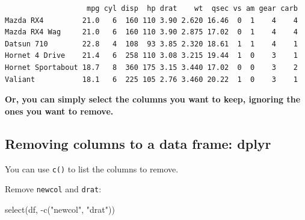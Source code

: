 \documentclass[
]{article}
\newenvironment{Shaded}{\begin{snugshade}}{\end{snugshade}}
\newcommand{\FunctionTok}[1]{\textcolor[rgb]{0.00,0.00,0.00}{#1}}
\newcommand{\NormalTok}[1]{#1}
\newcommand{\SpecialCharTok}[1]{\textcolor[rgb]{0.00,0.00,0.00}{#1}}
\newcommand{\StringTok}[1]{\textcolor[rgb]{0.31,0.60,0.02}{#1}}
\begin{document}
\begin{verbatim}
                   mpg cyl disp  hp drat    wt  qsec vs am gear carb
Mazda RX4         21.0   6  160 110 3.90 2.620 16.46  0  1    4    4
Mazda RX4 Wag     21.0   6  160 110 3.90 2.875 17.02  0  1    4    4
Datsun 710        22.8   4  108  93 3.85 2.320 18.61  1  1    4    1
Hornet 4 Drive    21.4   6  258 110 3.08 3.215 19.44  1  0    3    1
Hornet Sportabout 18.7   8  360 175 3.15 3.440 17.02  0  0    3    2
Valiant           18.1   6  225 105 2.76 3.460 20.22  1  0    3    1
\end{verbatim}

\textbf{Or, you can simply select the columns you want to keep, ignoring
the ones you want to remove.}

\hypertarget{removing-columns-to-a-data-frame-dplyr}{%
\subsection{Removing columns to a data frame:
dplyr}\label{removing-columns-to-a-data-frame-dplyr}}

You can use \texttt{c()} to list the columns to remove.

Remove \texttt{newcol} and \texttt{drat}:

\begin{Shaded}
\begin{Highlighting}[]
\FunctionTok{select}\NormalTok{(df, }\SpecialCharTok{{-}}\FunctionTok{c}\NormalTok{(}\StringTok{"newcol"}\NormalTok{, }\StringTok{"drat"}\NormalTok{))}
\end{Highlighting}
\end{Shaded}
\end{document}
